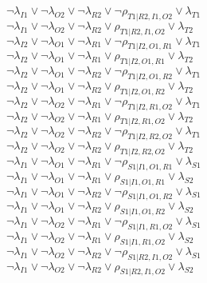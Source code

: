 $\neg\lambda_{I1} \vee \neg\lambda_{O2} \vee \neg\lambda_{R2} \vee \neg\rho_{T1|R2,I1,O2} \vee \lambda_{T1}$\\
$\neg\lambda_{I1} \vee \neg\lambda_{O2} \vee \neg\lambda_{R2} \vee \rho_{T1|R2,I1,O2} \vee \lambda_{T2}$\\
$\neg\lambda_{I2} \vee \neg\lambda_{O1} \vee \neg\lambda_{R1} \vee \neg\rho_{T1|I2,O1,R1} \vee \lambda_{T1}$\\
$\neg\lambda_{I2} \vee \neg\lambda_{O1} \vee \neg\lambda_{R1} \vee \rho_{T1|I2,O1,R1} \vee \lambda_{T2}$\\
$\neg\lambda_{I2} \vee \neg\lambda_{O1} \vee \neg\lambda_{R2} \vee \neg\rho_{T1|I2,O1,R2} \vee \lambda_{T1}$\\
$\neg\lambda_{I2} \vee \neg\lambda_{O1} \vee \neg\lambda_{R2} \vee \rho_{T1|I2,O1,R2} \vee \lambda_{T2}$\\
$\neg\lambda_{I2} \vee \neg\lambda_{O2} \vee \neg\lambda_{R1} \vee \neg\rho_{T1|I2,R1,O2} \vee \lambda_{T1}$\\
$\neg\lambda_{I2} \vee \neg\lambda_{O2} \vee \neg\lambda_{R1} \vee \rho_{T1|I2,R1,O2} \vee \lambda_{T2}$\\
$\neg\lambda_{I2} \vee \neg\lambda_{O2} \vee \neg\lambda_{R2} \vee \neg\rho_{T1|I2,R2,O2} \vee \lambda_{T1}$\\
$\neg\lambda_{I2} \vee \neg\lambda_{O2} \vee \neg\lambda_{R2} \vee \rho_{T1|I2,R2,O2} \vee \lambda_{T2}$\\
$\neg\lambda_{I1} \vee \neg\lambda_{O1} \vee \neg\lambda_{R1} \vee \neg\rho_{S1|I1,O1,R1} \vee \lambda_{S1}$\\
$\neg\lambda_{I1} \vee \neg\lambda_{O1} \vee \neg\lambda_{R1} \vee \rho_{S1|I1,O1,R1} \vee \lambda_{S2}$\\
$\neg\lambda_{I1} \vee \neg\lambda_{O1} \vee \neg\lambda_{R2} \vee \neg\rho_{S1|I1,O1,R2} \vee \lambda_{S1}$\\
$\neg\lambda_{I1} \vee \neg\lambda_{O1} \vee \neg\lambda_{R2} \vee \rho_{S1|I1,O1,R2} \vee \lambda_{S2}$\\
$\neg\lambda_{I1} \vee \neg\lambda_{O2} \vee \neg\lambda_{R1} \vee \neg\rho_{S1|I1,R1,O2} \vee \lambda_{S1}$\\
$\neg\lambda_{I1} \vee \neg\lambda_{O2} \vee \neg\lambda_{R1} \vee \rho_{S1|I1,R1,O2} \vee \lambda_{S2}$\\
$\neg\lambda_{I1} \vee \neg\lambda_{O2} \vee \neg\lambda_{R2} \vee \neg\rho_{S1|R2,I1,O2} \vee \lambda_{S1}$\\
$\neg\lambda_{I1} \vee \neg\lambda_{O2} \vee \neg\lambda_{R2} \vee \rho_{S1|R2,I1,O2} \vee \lambda_{S2}$\\
